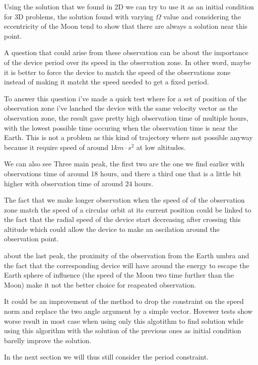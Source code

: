 \documentclass[11pt]{article} %
\begin{document}
		Using the solution that we found in 2D we can try to use it as an initial condition for 3D problems, the solution found with varying $\Omega$ value and considering the eccentricity of the Moon tend to show that there are always a solution near this point.
		
		A question that could arise from these observation can be about the importance of the device period over its speed in the observation zone. In other word, maybe it is better to force the device to match the speed of the observations zone instead of making it matcht the speed needed to get a fixed period.
		
		To answer this question i've made a quick test where for a set of position of the observation zone i've lanched the device with the same velocity vector as the observation zone, the result gave pretty high observation time of multiple hours, with the lowest possible time occuring when the observation time is near the Earth. This is not a problem as this kind of trajectory where not possible anyway because it require speed of around $1 km\cdot s^2$ at low altitudes.
		
		We can also see Three main peak, the first two are the one we find earlier with observations time of around 18 hours, and there a third one that is a little bit higher with observation time of around 24 hours.
		
		The fact that we make longer observation when the speed of of the observation zone match the speed of a circular orbit at its current position could be linked to the fact that the radial speed of the device start decreasing after crossing this altitude which could allow the device to make an oscilation around the observation point.
		
		about the last peak, the proximity of the observation from the Earth umbra and the fact that the corresponding device will have around the energy to escape the Earth sphere of influence (the speed of the Moon two time further than the Moon) make it not the better choice for reapeated observation.
		
		It could be an improvement of the method to drop the constraint on the speed norm and replace the two angle argument by a simple vector. Hovewer tests show worse result in most case when using only this algotithm to find solution while using this algorithm with the solution of the previous ones as initial condition barelly improve the solution.
		
		In the next section we will thus still consider the period constraint. 
		
\end{document}
